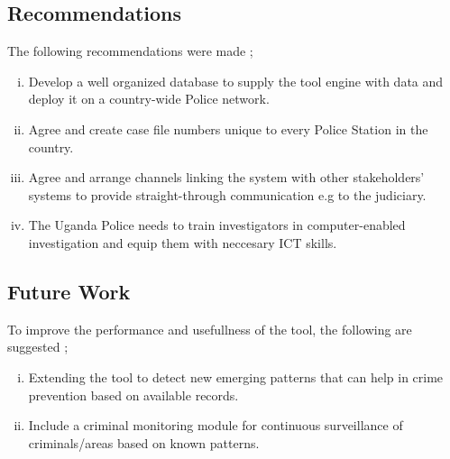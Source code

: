 \subsection{Recommendations}

\noindent The following recommendations were made ;

\begin{enumerate}[(i)]
\item Develop a well organized database to supply the tool engine with data and deploy it on a  country-wide Police network.
\item Agree and create case file numbers unique to every Police Station in the country.
\item Agree and arrange channels linking the system with other stakeholders' systems to provide straight-through communication e.g to the judiciary.
\item The Uganda Police needs to train investigators in computer-enabled investigation and equip them with neccesary ICT skills.
\end{enumerate}

\subsection{Future Work}

\noindent To improve the performance and usefullness of the tool, the following are suggested ;

\begin{enumerate}[(i)]
\item Extending the tool to detect new emerging patterns that can help in crime prevention based on available records.
\item Include a criminal monitoring module for continuous surveillance of criminals/areas based on known patterns.


\end{enumerate}
